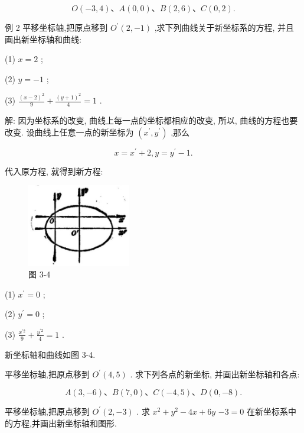 \documentclass[lang=cn,newtx,12pt,scheme=chinese]{elegantbook}
\begin{document}
\[
  O\left( {-3,4}\right) \text{、}A\left( {0,0}\right) \text{、}B\left( {2,6}\right) \text{、}C\left( {0,2}\right) \text{.}
\]

例 2 平移坐标轴,把原点移到 \({O}^{\prime }\left( {2, - 1}\right)\) ,求下列曲线关于新坐标系的方程, 并且画出新坐标轴和曲线:

(1) \(x = 2\) ;

(2) \(y = - 1\) ;

(3) \(\frac{{\left( x - 2\right) }^{2}}{9} + \frac{{\left( y + 1\right) }^{2}}{4} = 1\) .

解: 因为坐标系的改变, 曲线上每一点的坐标都相应的改变, 所以, 曲线的方程也要改变. 设曲线上任意一点的新坐标为 \(\left( {{x}^{\prime },{y}^{\prime }}\right)\) ,那么

\[
  x = {x}^{\prime } + 2,y = {y}^{\prime } - 1.
\]

代入原方程, 就得到新方程:

\begin{figure}[h]
  \centering
  \includegraphics[max width=0.4\textwidth]{images/01912cc2-ffb6-728e-9ae7-b113ff05c64b_135_995645.jpg}
  \caption{图 3-4}
\end{figure}

(1) \({x}^{\prime } = 0\) ;

(2) \({y}^{\prime } = 0\) ;

(3) \(\frac{{x}^{\prime 2}}{9} + \frac{{y}^{\prime 2}}{4} = 1\) .

新坐标轴和曲线如图 3-4.

\begin{problemset}[练习]

\item 平移坐标轴,把原点移到 \({O}^{\prime }\left( {4,5}\right)\) . 求下列各点的新坐标, 并画出新坐标轴和各点:

\[
  A\left( {3, - 6}\right) \text{、}B\left( {7,0}\right) \text{、}C\left( {-4,5}\right) \text{、}D\left( {0, - 8}\right) .
\]

\item 平移坐标轴,把原点移到 \({O}^{\prime }\left( {2, - 3}\right)\) . 求 \({x}^{2} + {y}^{2} - {4x} + {6y}\) \(- 3 = 0\) 在新坐标系中的方程,并画出新坐标轴和图形.

\end{problemset}
\end{document}
